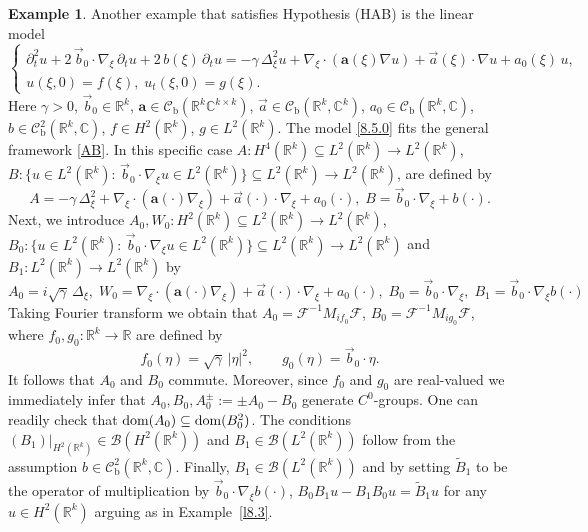 \documentclass[11pt]{amsart}
\numberwithin{equation}{section}
\newcommand\R{\mathbb R}
\newcommand\C{\mathbb C}
\newcommand{\RR}{{\mathbb R}}
\newcommand{\rmb}{{\mathrm{b}}}
\theoremstyle{remark}
\theoremstyle{definition}
\newtheorem{example}[theorem]{Example}
\newcommand\cC{{\mathcal C}}
\newcommand{\dom}{\text{\rm{dom}}}
\begin{document}
\begin{example}\label{e8.5}
	Another example that satisfies Hypothesis (HAB) is the linear model
	\begin{equation}\label{8.5.0}
		\begin{cases}
			\partial_t^2 u + 2\,\vec{b}_0\cdot\nabla_\xi\,\partial_t u + 2\,b(\xi)\,\partial_t u
			= -\gamma\,\Delta_\xi^2 u + \nabla_\xi\cdot(\mathbf{a}(\xi)\nabla u) + \vec{a}(\xi)\cdot\nabla u
			+ a_0(\xi)\,u,\\
			u(\xi,0) = f(\xi),\;
			u_t(\xi,0) = g(\xi).
		\end{cases}
	\end{equation}
	Here $\gamma > 0$, $\vec{b}_0 \in \R^k$, $\mathbf{a} \in \cC_\rmb(\R^k\C^{k\times k})$,
	$\vec{a} \in \cC_\rmb(\R^k,\C^k)$, $a_0 \in \cC_\rmb(\R^k,\C)$, $b \in \cC^2_\rmb(\R^k,\C)$,
	$f\in H^2(\R^k)$, $g \in L^2(\R^k)$.
	The model \eqref{8.5.0} fits the general framework \eqref{AB}. In this specific case $A: H^4(\R^k) \subseteq L^2(\R^k) \to L^2(\R^k)$,
	$B: \{u \in L^2(\R^k):\, \vec{b}_0\cdot\nabla_\xi u \in L^2(\R^k)\}\subseteq L^2(\R^k) \to L^2(\R^k)$, are defined by 
	\begin{equation}\label{8.5.1}
		A= -\gamma\,\Delta_\xi^2 + \nabla_\xi\cdot(\mathbf{a}(\cdot)\nabla_\xi) + \vec{a}(\cdot)\cdot\nabla_\xi + a_0(\cdot),\;B=\vec{b}_0\cdot\nabla_\xi+b(\cdot).
	\end{equation}
	Next, we introduce
	$A_0, W_0: H^2(\R^k)\subseteq L^2(\R^k)\to L^2(\R^k)$, $B_0: \{u \in L^2(\R^k):\, \vec{b}_0\cdot\nabla_\xi u \in L^2(\R^k)\}\subseteq L^2(\R^k) \to L^2(\R^k)$ and $B_1: L^2(\RR^k)\to L^2(\RR^k)$ by
	\begin{equation}\label{8.5.2}
		A_0= i\sqrt{\gamma}\,\Delta_\xi,\;W_0 = \nabla_\xi\cdot(\mathbf{a}(\cdot)\nabla_\xi) + \vec{a}(\cdot)\cdot\nabla_\xi + a_0(\cdot),\;B_0 = \vec{b}_0\cdot\nabla_\xi,\; B_1 = \vec{b}_0\cdot\nabla_\xi b(\cdot)
	\end{equation}
	Taking Fourier transform we obtain that
	$A_0 = \mathcal{F}^{-1} M_{if_0} \mathcal{F}$,
	$B_0 = \mathcal{F}^{-1} M_{ig_0} \mathcal{F}$,
	where $f_0, g_0: \R^k \to \R$ are defined by
	\begin{equation}\label{8.5.3}
		f_0(\eta) = \sqrt{\gamma}\,|\eta|^2,\qquad g_0(\eta) = \vec{b}_0\cdot\eta.
	\end{equation}
	It follows that $A_0$ and $B_0$ commute. Moreover, since $f_0$ and $g_0$ are real-valued
	we immediately infer that $A_0, B_0, A_0^\pm:= \pm A_0 - B_0$ generate $C^0$-groups.
	One can readily check that
	$\dom(A_0) \subseteq \dom(B_0^2)$. The conditions
	$(B_1)\big|_{H^2(\R^k)} \in \mathcal{B}(H^2(\R^k))$
	and $B_1 \in \mathcal{B}(L^2(\R^k))$ follow from the assumption
	$b \in \cC^2_\rmb(\R^k,\C)$. Finally, $B_1 \in \mathcal{B}(L^2(\R^k))$ and
	by setting $\widetilde{B}_1$ to be the operator of multiplication
	by $\vec{b}_0\cdot\nabla_\xi b(\cdot)$, $B_0 B_1 u - B_1 B_0 u = \widetilde{B}_1 u$ for any $u \in H^2(\R^k)$
	arguing as in Example~\ref{l8.3}.
\end{example} 
\end{document}

